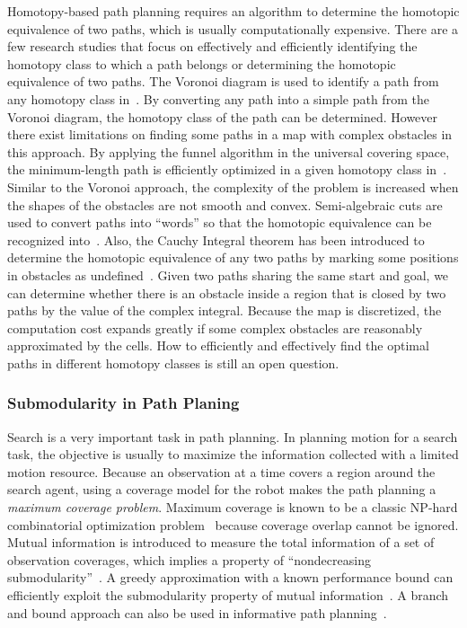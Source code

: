 \documentclass[phd]{byuprop}
\begin{document}
Homotopy-based path planning requires an algorithm to determine the homotopic equivalence of two paths, which is usually computationally expensive. 
There are a few research studies that focus on effectively and efficiently identifying the homotopy class to which a path belongs or determining the homotopic equivalence of two paths. 
The Voronoi diagram is used to identify a path from any homotopy class in~\cite{Banerjee2013}. 
By converting any path into a simple path from the Voronoi diagram, the homotopy class of the path can be determined. 
However there exist limitations on finding some paths in a map with complex obstacles in this approach.
By applying the funnel algorithm in the universal covering space, the minimum-length path is efficiently optimized in a given homotopy class in~\cite{Hershberger1994}. 
Similar to the Voronoi approach, the complexity of the problem is increased when the shapes of the obstacles are not smooth and convex. 
Semi-algebraic cuts are used to convert paths into “words” so that the homotopic equivalence can be recognized into~\cite{Grigoriev1998}. 
Also, the Cauchy Integral theorem has been introduced to determine the homotopic equivalence of any two paths by marking some positions in obstacles as undefined~\cite{Bhattachary2010}. 
Given two paths sharing the same start and goal, we can determine whether there is an obstacle inside a region that is closed by two paths by the value of the complex integral. 
Because the map is discretized, the computation cost expands greatly if some complex obstacles are reasonably approximated by the cells.
How to efficiently and effectively find the optimal paths in different homotopy classes is still an open question.

\subsubsection{Submodularity in Path Planing}
\label{sec:related_work:algorithm_specific_work:submodularity_in_path_planning}

Search is a very important task in path planning.
In planning motion for a search task, the objective is usually to maximize the information collected with a limited motion resource.
Because an observation at a time covers a region around the search agent, using a coverage model for the robot makes the path planning a {\em maximum coverage problem}.
Maximum coverage is known to be a classic NP-hard combinatorial optimization problem~\cite{Megiddo1983} because coverage overlap cannot be ignored. 
Mutual information is introduced to measure the total information
of a set of observation coverages, which implies a property of
“nondecreasing submodularity”~\cite{Singh2009}. 
A greedy approximation with a known performance bound can efficiently exploit the submodularity property of mutual information~\cite{Singh2009}. 
A branch and bound approach can also be used in informative path
planning~\cite{Binney2012}.
\end{document}
